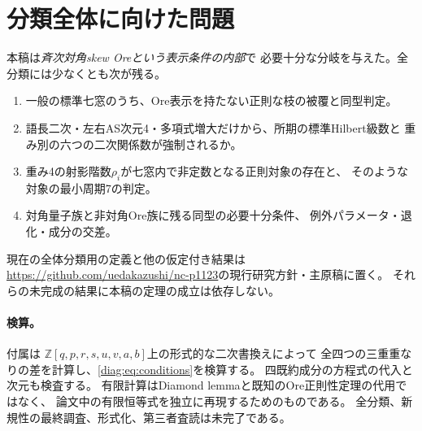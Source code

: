 \documentclass[11pt,a4paper]{ltjsarticle}
\theoremstyle{definition}
\newcommand{\ZZ}{\mathbb Z}
\begin{document}
\section{分類全体に向けた問題}
本稿は\emph{斉次対角skew Oreという表示条件の内部}で
必要十分な分岐を与えた。全分類には少なくとも次が残る。
\begin{enumerate}
\item 一般の標準七窓のうち、Ore表示を持たない正則な枝の被覆と同型判定。
\item 語長二次・左右AS次元4・多項式増大だけから、所期の標準Hilbert級数と
重み別の六つの二次関係数が強制されるか。
\item 重み4の射影階数$\rho_i$が七窓内で非定数となる正則対象の存在と、
そのような対象の最小周期7の判定。
\item 対角量子族と非対角Ore族に残る同型の必要十分条件、
例外パラメータ・退化・成分の交差。
\end{enumerate}
現在の全体分類用の定義と他の仮定付き結果は
\url{https://github.com/uedakazushi/nc-p1123}の現行研究方針・主原稿に置く。
それらの未完成の結果に本稿の定理の成立は依存しない。

\paragraph{検算。}
付属は
$\ZZ[q,p,r,s,u,v,a,b]$上の形式的な二次書換えによって
全四つの三重重なりの差を計算し、\eqref{diag:eq:conditions}を検算する。
四既約成分の方程式の代入と次元も検査する。
有限計算はDiamond lemmaと既知のOre正則性定理の代用ではなく、
論文中の有限恒等式を独立に再現するためのものである。
全分類、新規性の最終調査、形式化、第三者査読は未完了である。
\end{document}
